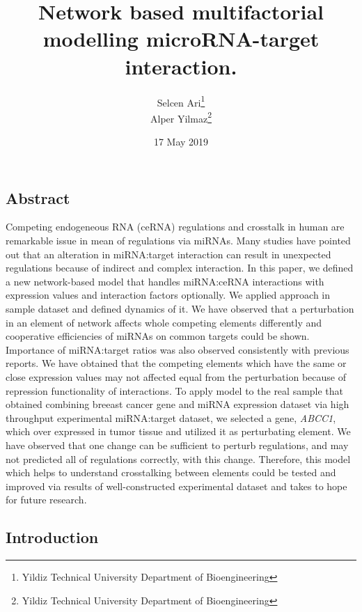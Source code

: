 \documentclass[]{article}
\title{Network based multifactorial modelling microRNA-target interaction.}
\author{Selcen Ari\footnote{Yildiz Technical University Department of
  Bioengineering} \\ Alper Yilmaz\footnote{Yildiz Technical University Department of
  Bioengineering}}
\date{17 May 2019}
\begin{document}
\maketitle

\hypertarget{abstract}{%
\subsection{Abstract}\label{abstract}}

Competing endogeneous RNA (ceRNA) regulations and crosstalk in human are
remarkable issue in mean of regulations via miRNAs. Many studies have
pointed out that an alteration in miRNA:target interaction can result in
unexpected regulations because of indirect and complex interaction. In
this paper, we defined a new network-based model that handles
miRNA:ceRNA interactions with expression values and interaction factors
optionally. We applied approach in sample dataset and defined dynamics
of it. We have observed that a perturbation in an element of network
affects whole competing elements differently and cooperative
efficiencies of miRNAs on common targets could be shown. Importance of
miRNA:target ratios was also observed consistently with previous
reports. We have obtained that the competing elements which have the
same or close expression values may not affected equal from the
perturbation because of repression functionality of interactions. To
apply model to the real sample that obtained combining breeast cancer
gene and miRNA expression dataset via high throughput experimental
miRNA:target dataset, we selected a gene, \emph{ABCC1}, which over
expressed in tumor tissue and utilized it as perturbating element. We
have observed that one change can be sufficient to perturb regulations,
and may not predicted all of regulations correctly, with this change.
Therefore, this model which helps to understand crosstalking between
elements could be tested and improved via results of well-constructed
experimental dataset and takes to hope for future research.

\hypertarget{introduction}{%
\subsection{Introduction}\label{introduction}}
\end{document}
